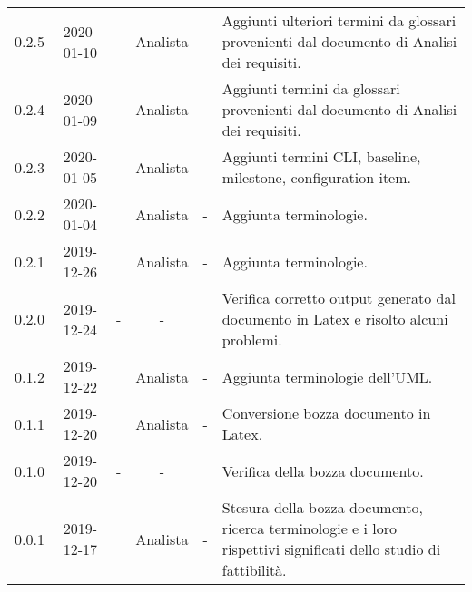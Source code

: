 {\begin{longtable}{ c c  C{2.5cm} c c C{3.5cm}}
0.2.5 & 2020-01-10 & \PF{} & Analista & - & Aggiunti ulteriori termini da glossari provenienti dal documento di Analisi dei requisiti. \\

0.2.4 & 2020-01-09 & \PF{} & Analista & - & Aggiunti termini da glossari provenienti dal documento di Analisi dei requisiti. \\

0.2.3 & 2020-01-05 & \AT{} & Analista & - & Aggiunti termini CLI, baseline, milestone, configuration item. \\

0.2.2 & 2020-01-04 & \MC{} & Analista & - & Aggiunta terminologie. \\

0.2.1 & 2019-12-26 & \MC{} & Analista & - & Aggiunta terminologie. \\

0.2.0 & 2019-12-24 & - & - & \DF{} & Verifica corretto output generato dal documento in Latex e risolto alcuni problemi. \\

0.1.2 & 2019-12-22 & \CE{} & Analista & - & Aggiunta terminologie dell'UML. \\

0.1.1 & 2019-12-20 & \MC{} & Analista & - & Conversione bozza documento in Latex. \\
		
0.1.0 & 2019-12-20 & - & - & \DF{} & Verifica della bozza documento. \\
		
0.0.1 & 2019-12-17 & \MC{} & Analista & - & Stesura della bozza documento, ricerca terminologie e i loro rispettivi significati dello studio di fattibilità. \\
		
\end{longtable}
}